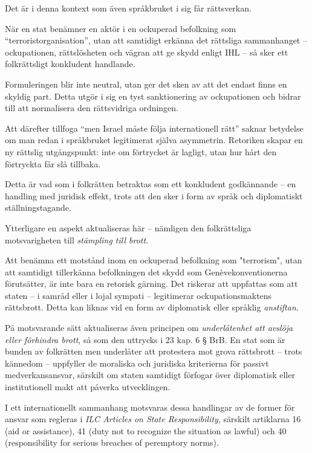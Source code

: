 \documentclass[12pt]{article}
\begin{document}
Det är i denna kontext som även språkbruket i sig får rättsverkan.

När en stat benämner en aktör i en ockuperad befolkning som “terroristorganisation”, utan att samtidigt erkänna det rättsliga sammanhanget – ockupationen, rättslösheten och vägran att ge skydd enligt IHL – så sker ett folkrättsligt konkludent handlande.

Formuleringen blir inte neutral, utan ger det sken av att det endast finns en skyldig part. Detta utgör i sig en tyst sanktionering av ockupationen och bidrar till att normalisera den rättsvidriga ordningen.

Att därefter tillfoga “men Israel måste följa internationell rätt” saknar betydelse om man redan i språkbruket legitimerat själva asymmetrin. Retoriken skapar en ny rättslig utgångspunkt: inte om förtrycket är lagligt, utan hur hårt den förtryckta får slå tillbaka.

Detta är vad som i folkrätten betraktas som ett konkludent godkännande – en handling med juridisk effekt, trots att den sker i form av språk och diplomatiskt ställningstagande.

Ytterligare en aspekt aktualiseras här – nämligen den folkrättsliga motsvarigheten till \textit{stämpling till brott}.

Att benämna ett motstånd inom en ockuperad befolkning som "terrorism", utan att samtidigt tillerkänna befolkningen det skydd som Genèvekonventionerna förutsätter, är inte bara en retorisk gärning. Det riskerar att uppfattas som att staten – i samråd eller i lojal sympati – legitimerar ockupationsmaktens rättsbrott. Detta kan liknas vid en form av diplomatisk eller språklig \textit{anstiftan}.

På motsvarande sätt aktualiseras även principen om \textit{underlåtenhet att avslöja eller förhindra brott}, så som den uttrycks i 23 kap. 6 § BrB. En stat som är bunden av folkrätten men underlåter att protestera mot grova rättsbrott – trots kännedom – uppfyller de moraliska och juridiska kriterierna för passivt medverkansansvar, särskilt om staten samtidigt förfogar över diplomatisk eller institutionell makt att påverka utvecklingen.

I ett internationellt sammanhang motsvaras dessa handlingar av de former för ansvar som regleras i \textit{ILC Articles on State Responsibility}, särskilt artiklarna 16 (aid or assistance), 41 (duty not to recognize the situation as lawful) och 40 (responsibility for serious breaches of peremptory norms).
\end{document}
